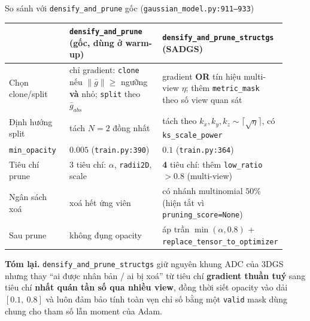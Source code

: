\begin{frame}{So sánh với \texttt{densify\_and\_prune} gốc (\texttt{gaussian\_model.py:911--933})}
\footnotesize
\begin{center}\scriptsize
\begin{tabular}{p{0.22\linewidth}p{0.34\linewidth}p{0.36\linewidth}}
\hline
 & \textbf{\texttt{densify\_and\_prune}} (gốc, dùng ở warm-up) & \textbf{\texttt{densify\_and\_prune\_structgs}} (SADGS) \\
\hline
Chọn clone/split & chỉ gradient: \texttt{clone} nếu $\|\bar g\|\ge$ ngưỡng \textbf{và} nhỏ; \texttt{split} theo $\bar g_{abs}$ & gradient \textbf{OR} tín hiệu multi-view $\eta$; thêm \texttt{metric\_mask} theo số view quan sát \\
Định hướng split & tách $N{=}2$ đồng nhất & tách theo $k_x,k_y,k_z \sim \lceil\sqrt{\eta}\rceil$, có \texttt{ks\_scale\_power} \\
\texttt{min\_opacity} & $0.005$ (\texttt{train.py:390}) & $\mathbf{0.1}$ (\texttt{train.py:364}) \\
Tiêu chí prune & 3 tiêu chí: $\alpha$, \texttt{radii2D}, scale & \textbf{4} tiêu chí: thêm \texttt{low\_ratio}$>0.8$ (multi-view) \\
Ngân sách xoá & xoá hết ứng viên & có nhánh multinomial $50\%$ (hiện tắt vì \texttt{pruning\_score=None}) \\
Sau prune & không đụng opacity & áp trần $\min(\alpha, 0.8)$ + \texttt{replace\_tensor\_to\_optimizer} \\
\hline
\end{tabular}
\end{center}
\textbf{Tóm lại.} \texttt{densify\_and\_prune\_structgs} giữ nguyên khung ADC của 3DGS nhưng thay ``ai được nhân bản / ai bị xoá'' từ tiêu chí \textbf{gradient thuần tuý} sang tiêu chí \textbf{nhất quán tần số qua nhiều view}, đồng thời siết opacity vào dải $[0.1,\ 0.8]$ và luôn đảm bảo tính toàn vẹn chỉ số bằng một \texttt{valid} mask dùng chung cho tham số lẫn moment của Adam.
\end{frame}
